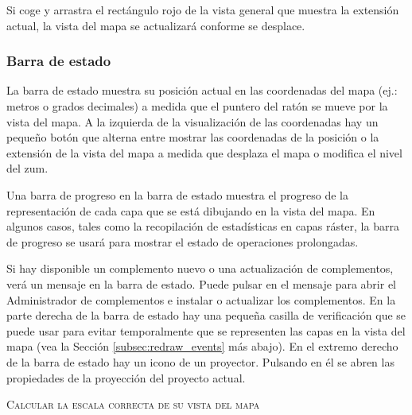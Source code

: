 Si coge y arrastra el rectángulo rojo de la vista general que muestra la extensión actual, la vista 
del mapa se actualizará conforme se desplace.

\subsubsection{Barra de estado}\label{label_statusbar}

La barra de estado muestra su posición actual en las coordenadas del mapa (ej.: metros o grados decimales) a medida 
que el puntero del ratón se mueve por la vista del mapa. A la izquierda de la visualización de las 
coordenadas hay un pequeño botón que alterna entre mostrar las coordenadas de la posición o la extensión 
de la vista del mapa a medida que desplaza el mapa o modifica el nivel del zum. 

Una barra de progreso en la barra de estado muestra el progreso de la representación de cada capa que se está 
dibujando en la vista del mapa. En algunos casos, tales como la recopilación de estadísticas en capas ráster, 
la barra de progreso se usará para mostrar el estado de operaciones prolongadas.

Si hay disponible un complemento nuevo o una actualización de complementos, verá un mensaje en la barra de estado. 
Puede pulsar en el mensaje para abrir el Administrador de complementos e instalar o actualizar los complementos.
En la parte derecha de la barra de estado hay una pequeña casilla de verificación 
que se puede usar para 
evitar temporalmente que se representen las capas en la vista del mapa (vea la Sección 
\ref{subsec:redraw_events} más abajo). 
En el extremo derecho de la barra de estado hay un icono de un proyector. 
Pulsando en él se abren 
las propiedades de la proyección del proyecto actual. 

\begin{Tip}\caption{\textsc{Calcular la escala correcta de su vista del mapa}}
\end{Tip}

